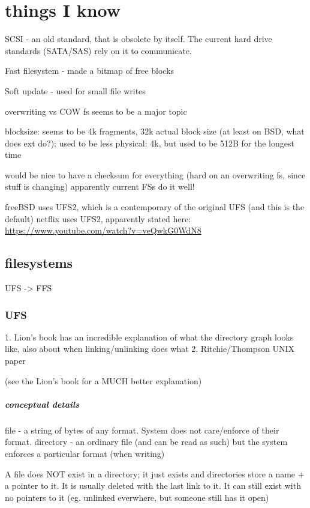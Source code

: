 \documentclass[a4paper]{article}
\begin{document}
\chapter{things I know}
    SCSI - an old standard, that is obsolete by itself. The current hard drive standards (SATA/SAS) rely on it to communicate.

    Fast filesystem - made a bitmap of free blocks

    Soft update - used for small file writes

    overwriting vs COW fs seems to be a major topic

    blocksize: seems to be 4k fragments, 32k actual block size (at least on BSD, what does ext do?); used to be less
    physical: 4k, but used to be 512B for the longest time

    would be nice to have a checksum for everything (hard on an overwriting fs, since stuff is changing)
    apparently current FSs do it well!

    freeBSD uses UFS2, which is a contemporary of the original UFS (and this is the default)
    netflix uses UFS2, apparently stated here: \url{https://www.youtube.com/watch?v=veQwkG0WdN8}
\section{filesystems}
    UFS -> FFS
    \subsection{UFS}
        1. Lion's book has an incredible explanation of what the directory graph
        looks like, also about when linking/unlinking does what
        2. Ritchie/Thompson UNIX paper

        (see the Lion's book for a MUCH better explanation)
        \paragraph{conceptual details}
        file - a string of bytes of any format. System does not care/enforce of
        their format.
        directory - an ordinary file (and can be read as such) but the system
        enforces a particular format (when writing)

        A file does NOT exist in a directory; it just exists and directories
        store a name + a pointer to it. It is usually deleted with the last
        link to it. It can still exist with no pointers to it (eg. unlinked
        everwhere, but someone still has it open)
\end{document}

